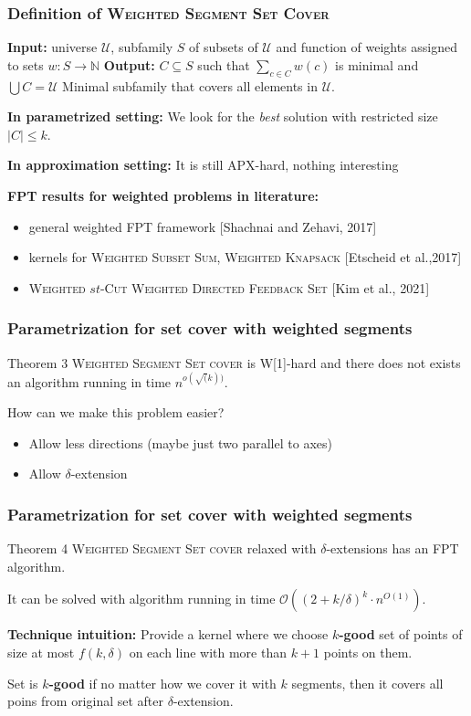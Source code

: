 \documentclass{beamer}
\begin{document}
\begin{frame}
\frametitle{Definition of \textsc{Weighted Segment Set Cover}}

\textbf{Input:} universe $\mathcal{U}$,
subfamily $S$ of subsets of $\mathcal{U}$
and function of weights assigned to sets $w : S \rightarrow \mathbb{N}$
\newline
\textbf{Output:} $C \subseteq S$ such that $\sum_{c \in C} w(c)$ is minimal and
$\bigcup C = \mathcal{U}$
\newline
Minimal subfamily that covers all elements in $\mathcal{U}$.

\bigskip
\textbf{In parametrized setting:}
We look for the \textit{best} solution with restricted size $|C| \le k$.

\textbf{In approximation setting:}
It is still APX-hard, nothing interesting
\bigskip

\textbf{FPT results for weighted problems in literature:}
\begin{itemize}
\item general weighted FPT framework {[Shachnai and Zehavi, 2017]}
\item kernels for \textsc{Weighted Subset Sum}, \textsc{Weighted Knapsack} {[Etscheid et al.,2017]}
\item \textsc{Weighted $st$-Cut} \textsc{Weighted Directed Feedback Set} {[Kim et al., 2021]}
\end{itemize}


\end{frame}

\begin{frame}
\frametitle{Parametrization for set cover with weighted segments}
\begin{block}{Theorem 3}
	\textsc{Weighted Segment Set cover} is W[1]-hard
	and there does not exists an algorithm running in time $n^{o(\sqrt(k))}$.
\end{block}

How can we make this problem easier?
\begin{itemize}
\item Allow less directions (maybe just two parallel to axes)
\item Allow $\delta$-extension
\end{itemize}
\end{frame}

\begin{frame}
\frametitle{Parametrization for set cover with weighted segments}
\begin{block}{Theorem 4}
	\textsc{Weighted Segment Set cover} relaxed
	with $\delta$-extensions has an FPT algorithm.
	
	It can be solved with algorithm running in time $\mathcal{O}((2+k/\delta)^k \cdot n^{O(1)})$.
\end{block}

\textbf{Technique intuition:} Provide a kernel where we choose
\textbf{$k$-good} set of points of size at most $f(k, \delta)$
on each line with more than $k+1$ points on them.

Set is \textbf{$k$-good} if no matter how we cover it with $k$
segments, then it covers all poins from original set after $\delta$-extension.
\end{frame}
\end{document}
